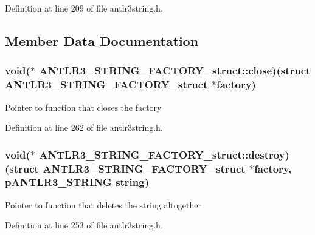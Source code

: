 Definition at line 209 of file antlr3string.\-h.



\subsection{Member Data Documentation}
\hypertarget{struct_a_n_t_l_r3___s_t_r_i_n_g___f_a_c_t_o_r_y__struct_af4da304dc103e7b5498dcbcd95f4026b}{
\subsubsection[{close}]{\setlength{\rightskip}{0pt plus 5cm}void($\ast$ A\-N\-T\-L\-R3\-\_\-\-S\-T\-R\-I\-N\-G\-\_\-\-F\-A\-C\-T\-O\-R\-Y\-\_\-struct\-::close)(struct {\bf A\-N\-T\-L\-R3\-\_\-\-S\-T\-R\-I\-N\-G\-\_\-\-F\-A\-C\-T\-O\-R\-Y\-\_\-struct} $\ast$factory)}}\label{struct_a_n_t_l_r3___s_t_r_i_n_g___f_a_c_t_o_r_y__struct_af4da304dc103e7b5498dcbcd95f4026b}
Pointer to function that closes the factory 

Definition at line 262 of file antlr3string.\-h.

\hypertarget{struct_a_n_t_l_r3___s_t_r_i_n_g___f_a_c_t_o_r_y__struct_ac74244ea330abbeef1ed7f519477f7b9}{
\subsubsection[{destroy}]{\setlength{\rightskip}{0pt plus 5cm}void($\ast$ A\-N\-T\-L\-R3\-\_\-\-S\-T\-R\-I\-N\-G\-\_\-\-F\-A\-C\-T\-O\-R\-Y\-\_\-struct\-::destroy)(struct {\bf A\-N\-T\-L\-R3\-\_\-\-S\-T\-R\-I\-N\-G\-\_\-\-F\-A\-C\-T\-O\-R\-Y\-\_\-struct} $\ast$factory, {\bf p\-A\-N\-T\-L\-R3\-\_\-\-S\-T\-R\-I\-N\-G} string)}}\label{struct_a_n_t_l_r3___s_t_r_i_n_g___f_a_c_t_o_r_y__struct_ac74244ea330abbeef1ed7f519477f7b9}
Pointer to function that deletes the string altogether 

Definition at line 253 of file antlr3string.\-h.

